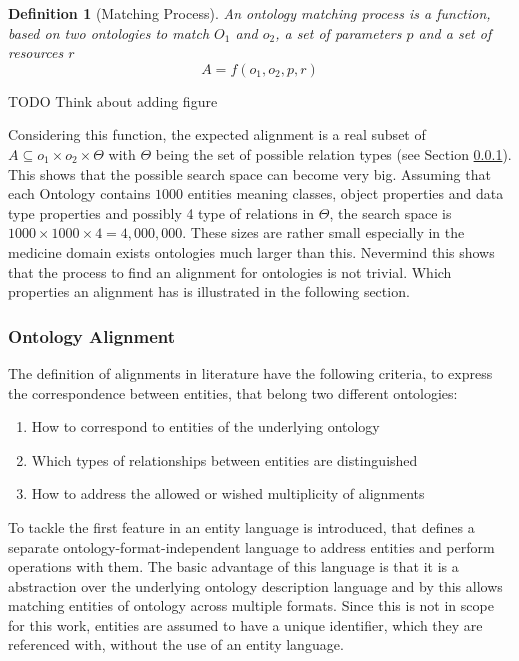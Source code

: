 \documentclass[11pt,titlepage,oneside,openany,a4paper]{report}
\newtheorem{definition}{Definition}[chapter]
\begin{document}
\begin{definition} [Matching Process]
An ontology matching process is a function, based on two ontologies to match $O_1$ and $o_2$, a set of parameters $p$ and  a set of resources $r$
\begin{equation*}
A = f (o_1, o_2, p,r)
\end{equation*}
\end{definition}

\begin{LARGE}
TODO Think about adding figure
\end{LARGE}

Considering this function, the expected alignment is a real subset of $ A \subseteq o_1 \times o_2 \times \Theta$ with $\Theta$ being the set of possible relation types (see Section \ref{sec:oa_def}). This shows that the possible search space can become very big. Assuming that each Ontology contains $1000$ entities meaning classes, object properties and data type properties and possibly 4 type of relations in $\Theta$, the  search space is $1000 \times 1000 \times 4 = 4,000,000$. These sizes are rather small especially in the medicine domain exists ontologies much larger than this.  Nevermind this shows that the process to find an alignment for ontologies is not trivial. \cite{ehrig2006ontology}
Which properties an alignment has is illustrated in the following section.

\subsubsection{Ontology Alignment}
\label{sec:oa_def}
The definition of alignments in literature have the following criteria, to express the correspondence between entities, that belong two different ontologies:
\begin{enumerate}
\item How to correspond to entities of the underlying ontology
\item Which types of relationships between entities are distinguished
\item How to address the allowed or wished multiplicity of alignments
\end{enumerate}

To tackle the first feature in \cite{euzenat2013d} an entity language is introduced, that defines a separate ontology-format-independent language to address entities and perform operations with them. The basic advantage of this language is that it is a abstraction over the underlying ontology description language and by this allows matching entities of ontology across multiple formats. Since this is not in scope for this work, entities are assumed to have a unique identifier, which they are referenced with, without the use of an entity language.
\end{document}
